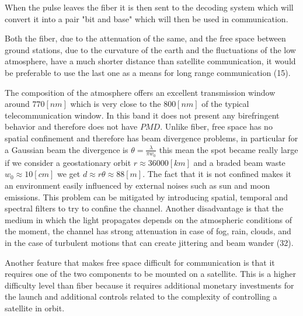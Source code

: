 When the pulse leaves the fiber it is then sent to the decoding system which will convert it into a pair "bit and base" which will then be used in communication.


Both the fiber, due to the attenuation of the same, and the free space between ground stations, due to the curvature of the earth and the fluctuations of the low atmosphere, have a much shorter distance than satellite communication, it would be preferable to use the last one as a means for long range communication (15).

The composition of the atmosphere offers an excellent transmission window around $770 [nm]$ which is very close to the $800 [nm]$ of the typical telecommunication window. In this band it does not present any birefringent behavior and therefore does not have $PMD$. Unlike fiber, free space has no spatial confinement and therefore has beam divergence problems, in particular for a Gaussian beam the divergence is $\theta = \frac{\lambda}{\pi w_0}$ this mean the spot became really large if we consider a geostationary orbit $r \approx 36000[km]$ and a braded beam waste $w_0 \approx 10 [cm]$ we get $d \approx r \theta \approx 88 [m]$. The fact that it is not confined makes it an environment easily influenced by external noises such as sun and moon emissions. This problem can be mitigated by introducing spatial, temporal and spectral filters to try to confine the channel. Another disadvantage is that the medium in which the light propagates depends on the atmospheric conditions of the moment, the channel has strong attenuation in case of fog, rain, clouds, and in the case of turbulent motions that can create jittering and beam wander (32).

Another feature that makes free space difficult for communication is that it requires one of the two components to be mounted on a satellite. This is a higher difficulty level than fiber because it requires additional monetary investments for the launch and additional controls related to the complexity of controlling a satellite in orbit.





